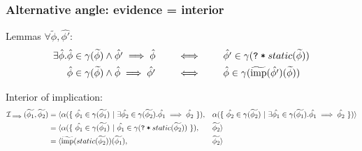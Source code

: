 \documentclass[11pt,a4paper]{article}
\newcommand{\grad}[1]{\widetilde{#1}}
\newcommand{\ttt}{\texttt}
\newcommand{\qm}{\ttt{?}}
\newcommand{\withqm}[1]{\ttt{\qm\:*\:$#1$}}
\newcommand{\imp}{\textrm{imp}}
\begin{document}

\subsubsection{Alternative angle: evidence = interior}
Lemmas $\forall \grad{\phi}, \hat{\phi'}$:
\begin{align*}
\exists \hat{\phi}. 
&\hat{\phi} \in \gamma(\grad{\phi}) \wedge \hat{\phi'} \implies \hat{\phi}
\quad\quad
\iff
\quad\quad
\hat{\phi'} \in \gamma(\withqm{static(\grad{\phi})})\\
&\hat{\phi} \in \gamma(\grad{\phi}) \wedge \hat{\phi} \implies \hat{\phi'}
\quad\quad
\iff
\quad\quad
\hat{\phi} \in \gamma(\grad{\imp}(\hat{\phi'})(\grad{\phi}))\\
\end{align*}


Interior of implication:
\begin{align*}
\mathcal{I}_{\implies}(\grad{\phi_1}, \grad{\phi_2})
= \langle 
    &\alpha(\{~ \hat{\phi_1} \in \gamma(\grad{\phi_1}) ~|~ \exists \hat{\phi_2} \in \gamma(\grad{\phi_2}). \hat{\phi_1} \implies \hat{\phi_2} ~\}),
    &&\alpha(\{~ \hat{\phi_2} \in \gamma(\grad{\phi_2}) ~|~ \exists \hat{\phi_1} \in \gamma(\grad{\phi_1}). \hat{\phi_1} \implies \hat{\phi_2} ~\}) 
\rangle\\
= \langle 
    &\alpha(\{~ \hat{\phi_1} \in \gamma(\grad{\phi_1}) ~|~ \hat{\phi_1} \in \gamma(\withqm{static(\grad{\phi_2})}) ~\}),
    &&\grad{\phi_2} 
\rangle\\
= \langle 
    &\grad{\imp}(static(\grad{\phi_2}))(\grad{\phi_1}),
    &&\grad{\phi_2} 
\rangle\\
\end{align*}
\end{document}
